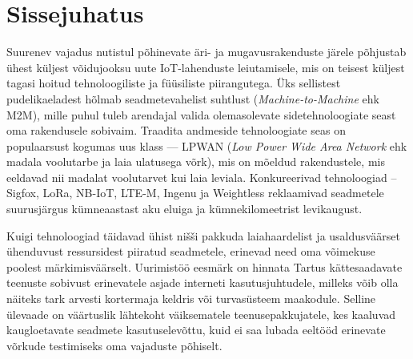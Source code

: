 \documentclass[12pt]{article}
\newcommand{\TODO}{\todo[inline]}
\begin{document}
    {\EngInfo}{\EstInfo}


    \newpage
    \setlength{\parskip}{0em}
    \tableofcontents
    \setlength{\parskip}{1em}



    \newpage
    \section{Sissejuhatus}


    Suurenev vajadus nutistul põhinevate äri- ja mugavusrakenduste järele põhjustab ühest küljest võidujooksu uute IoT-lahenduste leiutamisele, mis on teisest küljest tagasi hoitud tehnoloogiliste ja füüsiliste piirangutega.
    Üks sellistest pudelikaeladest hõlmab seadmetevahelist suhtlust (\textit{Machine-to-Machine} ehk M2M), mille puhul tuleb arendajal valida olemasolevate sidetehnoloogiate seast oma rakendusele sobivaim.
    Traadita andmeside tehnoloogiate seas on populaarsust kogumas uus klass — LPWAN (\textit{Low Power Wide Area Network} ehk madala voolutarbe ja laia ulatusega võrk), mis on mõeldud rakendustele, mis eeldavad nii madalat voolutarvet kui laia leviala.
    Konkureerivad tehnoloogiad -- Sigfox, LoRa, NB-IoT, LTE-M, Ingenu ja Weightless reklaamivad seadmetele suurusjärgus kümneaastast aku eluiga ja kümnekilomeetrist levikaugust.

    Kuigi tehnoloogiad täidavad ühist nišši pakkuda laiahaardelist ja usaldusväärset ühenduvust ressursidest piiratud seadmetele, erinevad need oma võimekuse poolest märkimisväärselt.
    Uurimistöö eesmärk on hinnata Tartus kättesaadavate teenuste sobivust erinevatele asjade interneti kasutusjuhtudele, milleks võib olla näiteks tark arvesti kortermaja keldris või turvasüsteem maakodule.
    Selline ülevaade on väärtuslik lähtekoht väiksematele teenusepakkujatele, kes kaaluvad kaugloetavate seadmete kasutuselevõttu, kuid ei saa lubada eeltööd erinevate võrkude testimiseks oma vajaduste põhiselt.
\end{document}
